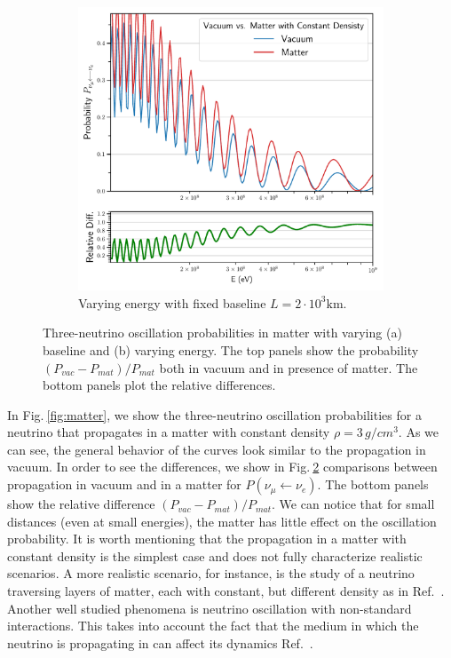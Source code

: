 \documentclass[twocolumn,secnumarabic,amssymb, nobibnotes, aps, prd,10pt]{revtex4-1}
\newcommand{\Fig}[1]{Fig.$\:$\ref{#1}}
\begin{document}
\begin{figure}
\begin{subfigure}{1.05\linewidth}
\includegraphics[width=\linewidth]{EngVacMatt.pdf}
\caption{Varying energy with fixed baseline $L=2 \cdot 10^3 \mathrm{km}$.} 
\label{fig:comparison} 
\end{subfigure}
\caption{Three-neutrino oscillation probabilities in matter with varying (a) baseline
and (b) varying energy. The top panels show the probability $\left( P_{vac} - P_{mat} 
\right) / P_{mat}$ both in vacuum and in presence of matter. The bottom panels plot
the relative differences.}
\end{figure}
In \Fig{fig:matter}, we show the three-neutrino oscillation probabilities for a neutrino
that propagates in a matter with constant density $\rho = 3 \, g/cm^3$. As we can see, the 
general behavior of the curves look similar to the propagation in vacuum. In order to
see the differences, we show in \Fig{fig:comparison} comparisons between propagation in
vacuum and in a matter for $P \left( \nu_\mu \longleftarrow \nu_e \right)$. The bottom
panels show the relative difference $\left( P_{vac} - P_{mat} \right) / P_{mat}$. We can
notice that for small distances (even at small energies), the matter has little effect
on the oscillation probability. It is worth mentioning that the propagation in a matter
with constant density is the simplest case and does not fully characterize realistic
scenarios. A more realistic scenario, for instance, is the study of a neutrino traversing
layers of matter, each with constant, but different density as in Ref.~\cite{Chizhov:1999az, 
Chizhov:1999he, Merfeld:2014cha}. Another well studied phenomena is neutrino oscillation 
with non-standard interactions. This takes into account the fact that the medium in which 
the neutrino is propagating in can affect its dynamics Ref.~\cite{Jacobsson:2001zk, Ohlsson:2003ip,
Arguelles:2012nw, Roe:2017zdw, Kelly:2018kmb}.
\end{document}
